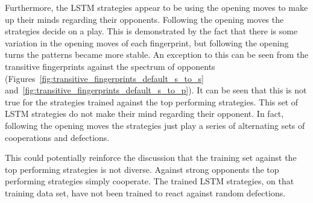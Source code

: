 Furthermore, the LSTM strategies appear to be using the opening moves to make up
their minds regarding their opponents. Following the opening moves the
strategies decide on a play. This is demonstrated by the fact that there is
some variation in the opening moves of each fingerprint, but following the
opening turns the patterns became more stable. An exception to this can be seen from the transitive fingerprints
against the spectrum of \Random opponents
(Figures~\ref{fig:transitive_fingerprints_default_s_to_s}
and~\ref{fig:transitive_fingerprints_default_s_to_p}). It can be seen that this
is not true for the strategies trained against the top performing strategies.
This set of LSTM strategies do not make their mind regarding their opponent. In
fact, following the opening moves the strategies just play a series of
alternating sets of cooperations and defections.

This could potentially reinforce the discussion that the training set against
the top performing strategies is not diverse. Against strong opponents the
top performing strategies simply cooperate. The trained LSTM strategies, on that
training data set, have not been trained to react against random defections.

